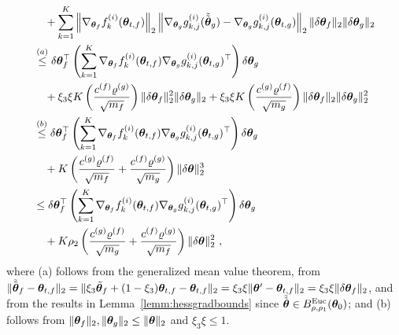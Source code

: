 \begin{align*}
    & \quad +  \sum_{k=1}^K \left\| \nabla_{{\bm{\theta}}_f} f_k^{(i)}({\bm{\theta}}_{t,f}) \right\|_2 \left\| \nabla_{{\bm{\theta}}_g} g_{k,j}^{(i)}(\tilde{\tilde{{\bm{\theta}}}}_g) - \nabla_{{\bm{\theta}}_g} g_{k,j}^{(i)}({\bm{\theta}}_{t,g})  \right\|_2 \| \delta {\bm{\theta}}_f \|_2 \| \delta {\bm{\theta}}_g \|_2 \\
    & \overset{(a)}{\leq} 
    \delta {\bm{\theta}}_f^\top \left( \sum_{k=1}^K \nabla_{{\bm{\theta}}_f} f_k^{(i)}({\bm{\theta}}_{t,f}) \nabla_{{\bm{\theta}}_g} g_{k,j}^{(i)}({\bm{\theta}}_{t,g})^\top \right) \delta {\bm{\theta}}_g 
    \\
    &\quad+\xi_3\xi K\left( \frac{c^{(f)} \varrho^{(g)}}{\sqrt{m_f}} \right) \| \delta {\bm{\theta}}_f \|_2^2 \| \delta {\bm{\theta}}_g \|_2 
    +\xi_3\xi K\left( \frac{c^{(g)} \varrho^{(f)}}{\sqrt{m_g}} \right) \| \delta {\bm{\theta}}_f \|_2 \| \delta {\bm{\theta}}_g \|_2^2
    \\
    & \overset{(b)}{\leq} \delta {\bm{\theta}}_f^\top \left( \sum_{k=1}^K \nabla_{{\bm{\theta}}_f} f_k^{(i)}({\bm{\theta}}_{t,f}) \nabla_{{\bm{\theta}}_g} g_{k,j}^{(i)}({\bm{\theta}}_{t,g})^\top \right) \delta {\bm{\theta}}_g\\
    &\quad+ K\left( \frac{c^{(g)} \varrho^{(f)}}{\sqrt{m_f}} + \frac{c^{(f)} \varrho^{(g)}}{\sqrt{m_g}} \right) \| \delta {\bm{\theta}} \|_2^3\\
    & \leq \delta {\bm{\theta}}_f^\top \left( \sum_{k=1}^K \nabla_{{\bm{\theta}}_f} f_k^{(i)}({\bm{\theta}}_{t,f}) \nabla_{{\bm{\theta}}_g} g_{k,j}^{(i)}({\bm{\theta}}_{t,g})^\top \right) \delta {\bm{\theta}}_g\\
    &\quad+ K\rho_2\left( \frac{c^{(g)} \varrho^{(f)}}{\sqrt{m_g}} + \frac{c^{(f)} \varrho^{(g)}}{\sqrt{m_f}} \right) \| \delta {\bm{\theta}} \|_2^2~,
\end{align*}
where (a) follows from the generalized mean value theorem, from $\lVert\tilde{\tilde{{\bm{\theta}}}}_f-{\bm{\theta}}_{t,f}\rVert_2= \lVert\xi_3 \tilde{{\bm{\theta}}}_f+(1-\xi_3){\bm{\theta}}_{t,f}-{\bm{\theta}}_{t,f}\rVert_2=\xi_3\xi\lVert{\bm{\theta}}'-{\bm{\theta}}_{t,f}\rVert_2=\xi_3\xi\lVert\delta{\bm{\theta}}_f\rVert_2$, and from the results in Lemma~\ref{lemm:hessgradbounds} since $\tilde{\tilde{{\bm{\theta}}}}\in B^{\mathrm{Euc}}_{\rho,\rho_1}({\bm{\theta}}_0)$; and (b) follows from $\lVert{\bm{\theta}}_f\rVert_2,\lVert{\bm{\theta}}_g\rVert_2\leq \lVert{\bm{\theta}}\rVert_2$ and $\xi_3\xi\leq 1$.

